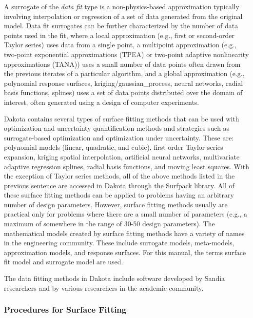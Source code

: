 A surrogate of the {\em data fit} type is a non-physics-based
approximation typically involving interpolation or regression of a set
of data generated from the original model.  Data fit surrogates can be
further characterized by the number of data points used in the fit,
where a local approximation (e.g., first or second-order Taylor
series) uses data from a single point, a multipoint approximation
(e.g., two-point exponential approximations (TPEA) or two-point
adaptive nonlinearity approximations (TANA)) uses a small number of
data points often drawn from the previous iterates of a particular
algorithm, and a global approximation (e.g., polynomial response
surfaces, kriging/gaussian\_process, neural networks, radial basis 
functions, splines)
uses a set of data points distributed over the domain of interest,
often generated using a design of computer experiments.

Dakota contains several types of surface fitting methods that can be
used with optimization and uncertainty quantification methods and
strategies such as surrogate-based optimization and optimization under
uncertainty. These are: polynomial models (linear, quadratic, and
cubic), first-order Taylor series expansion, kriging spatial
interpolation, artificial neural networks, multivariate adaptive
regression splines, radial basis functions, and moving least squares. 
With the exception of Taylor series methods, all of the above methods 
listed in the previous sentence are accessed in Dakota through the 
Surfpack library.  All of these surface fitting methods can be
applied to problems having an arbitrary number of design parameters.
However, surface fitting methods usually are practical only for
problems where there are a small number of parameters (e.g., a maximum
of somewhere in the range of 30-50 design parameters). The
mathematical models created by surface fitting methods have a variety
of names in the engineering community. These include surrogate models,
meta-models, approximation models, and response surfaces. For this
manual, the terms surface fit model and surrogate model are used.

The data fitting methods in Dakota include software developed by
Sandia researchers and by various researchers in the academic
community.

\subsubsection{Procedures for Surface Fitting}\label{models:surf:procedures}


